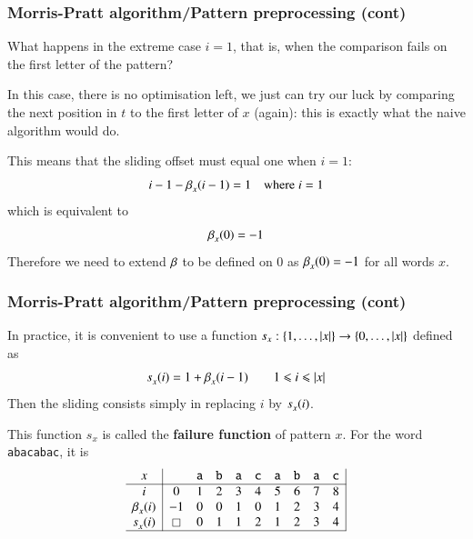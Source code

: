 %
\begin{frame}
\frametitle{Morris-Pratt algorithm/Pattern preprocessing (cont)}

\label{beta_zero}

What happens in the extreme case \(i = 1\), that is, when the
comparison fails on the first letter of the pattern?

\bigskip

In this case, there is no optimisation left, we just can try our luck
by comparing the next position in \(t\) to the first letter of \(x\)
(again): this is exactly what the naive algorithm would do.

\bigskip

This means that the sliding offset must equal one when \(i=1\):
\[
i - 1 - \beta_{x}^{}(i-1) = 1 \quad \text{where} \; i = 1
\]
which is equivalent to
\[
\beta_{x}^{}(0) = -1
\]
Therefore we need to extend \(\beta\) to be defined on \(0\) as
\(\beta_{x}^{}(0) = -1\) for all words \(x\).

\end{frame}

%
\begin{frame}
\frametitle{Morris-Pratt algorithm/Pattern preprocessing (cont)}

\label{supply}

In practice, it is convenient to use a function
\(
s_{x}: \{1, \dots, \lvert{x}\lvert{}\} \rightarrow \{0, \dots, \lvert{x}\lvert{}\}
\)
defined as
\[
s_{x}^{}(i) = 1 + \beta_{x}^{}(i-1) \qquad 1 \leqslant i \leqslant
\lvert{x}\lvert{}
\]
Then the sliding consists simply in replacing \(i\) by \(s_{x}^{}(i)\).

\bigskip

This function \(s_{x}\) is called the \textbf{failure function} of
pattern \(x\). For the word \texttt{abacabac}, it is
\[
\begin{array}{c|ccccccccc|}
x & & \texttt{a} & \texttt{b} & \texttt{a} & \texttt{c} & \texttt{a}
 & \texttt{b} & \texttt{a} & \texttt{c}\\
\hline
  i
& 0 & 1 & 2 & 3 & 4 & 5 & 6 & 7 & 8\\
  \beta_{x}^{}(i)
& -1 & 0 & 0 & 1 & 0 & 1 & 2 & 3 & 4\\
  s_{x}^{}(i)
& \boxempty & 0 & 1 & 1 & 2 & 1 & 2 & 3 & 4\\
\hline
\end{array}
\]

\end{frame}

